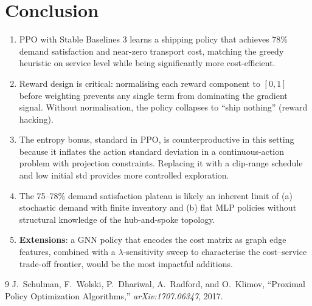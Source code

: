 \documentclass[11pt]{article}
\begin{document}
\section{Conclusion}

\begin{enumerate}[nosep]
    \item PPO with Stable Baselines 3 learns a shipping policy that achieves 78\% demand satisfaction and near-zero transport cost, matching the greedy heuristic on service level while being significantly more cost-efficient.

    \item Reward design is critical: normalising each reward component to $[0,1]$ before weighting prevents any single term from dominating the gradient signal. Without normalisation, the policy collapses to ``ship nothing'' (reward hacking).

    \item The entropy bonus, standard in PPO, is counterproductive in this setting because it inflates the action standard deviation in a continuous-action problem with projection constraints. Replacing it with a clip-range schedule and low initial std provides more controlled exploration.

    \item The 75--78\% demand satisfaction plateau is likely an inherent limit of (a) stochastic demand with finite inventory and (b) flat MLP policies without structural knowledge of the hub-and-spoke topology.

    \item \textbf{Extensions}: a GNN policy that encodes the cost matrix as graph edge features, combined with a $\lambda$-sensitivity sweep to characterise the cost--service trade-off frontier, would be the most impactful additions.
\end{enumerate}

\begin{thebibliography}{9}
J.~Schulman, F.~Wolski, P.~Dhariwal, A.~Radford, and O.~Klimov,
``Proximal Policy Optimization Algorithms,'' \textit{arXiv:1707.06347}, 2017.
\end{thebibliography}
\end{document}
